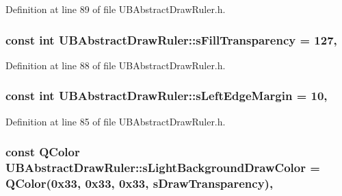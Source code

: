 Definition at line 89 of file U\-B\-Abstract\-Draw\-Ruler.\-h.

\hypertarget{class_u_b_abstract_draw_ruler_ac1c6c55d78cb6754791f657a8de5ef7e}{
\subsubsection[{s\-Fill\-Transparency}]{\setlength{\rightskip}{0pt plus 5cm}const int U\-B\-Abstract\-Draw\-Ruler\-::s\-Fill\-Transparency = 127\hspace{0.3cm}{\ttfamily [static]}, {\ttfamily [protected]}}}\label{d0/de1/class_u_b_abstract_draw_ruler_ac1c6c55d78cb6754791f657a8de5ef7e}


Definition at line 88 of file U\-B\-Abstract\-Draw\-Ruler.\-h.

\hypertarget{class_u_b_abstract_draw_ruler_a7462cd58ac10ab7911361ac63dd8cc81}{
\subsubsection[{s\-Left\-Edge\-Margin}]{\setlength{\rightskip}{0pt plus 5cm}const int U\-B\-Abstract\-Draw\-Ruler\-::s\-Left\-Edge\-Margin = 10\hspace{0.3cm}{\ttfamily [static]}, {\ttfamily [protected]}}}\label{d0/de1/class_u_b_abstract_draw_ruler_a7462cd58ac10ab7911361ac63dd8cc81}


Definition at line 85 of file U\-B\-Abstract\-Draw\-Ruler.\-h.

\hypertarget{class_u_b_abstract_draw_ruler_a9d7a6e8677dc8ea83707b7af2d2879d9}{
\subsubsection[{s\-Light\-Background\-Draw\-Color}]{\setlength{\rightskip}{0pt plus 5cm}const Q\-Color U\-B\-Abstract\-Draw\-Ruler\-::s\-Light\-Background\-Draw\-Color = Q\-Color(0x33, 0x33, 0x33, s\-Draw\-Transparency)\hspace{0.3cm}{\ttfamily [static]}, {\ttfamily [protected]}}}\label{d0/de1/class_u_b_abstract_draw_ruler_a9d7a6e8677dc8ea83707b7af2d2879d9}


